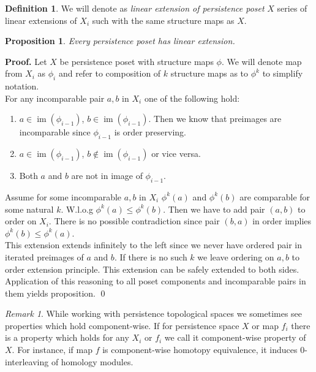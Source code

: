 \documentclass[a4paper, 12pt]{article}
\newtheorem{proposition}{Proposition}
\theoremstyle{definition}
\newtheorem{definition}{Definition}
\theoremstyle{remark}
\newtheorem{remark}{Remark}
\newenvironment{pf}{\noindent\textbf{Proof.}}{\qed}
\newcommand{\define}[1]{{\textit{#1}}}
\renewcommand{\leq}{\leqslant}
\begin{document}
\begin{definition}
  We will denote as \define{linear extension of persistence poset} $X$ series of linear extensions of $X_i$ such with the same structure maps as $X$.
\end{definition}

\begin{proposition}
  Every persistence poset has linear extension.
\end{proposition}

\begin{pf}
  Let $X$ be persistence poset with structure maps $\phi$. We will denote map from $X_i$ as $\phi_i$ and refer to composition of $k$ structure maps as to $\phi^k$ to simplify notation.\\

  For any incomparable pair $a,b$ in $X_i$ one of the following hold:
  \begin{enumerate}
    \item $a \in \operatorname{im}(\phi_{i-1})$, $b \in \operatorname{im}(\phi_{i-1})$. Then we know that preimages are incomparable since $\phi_{i-1}$ is order preserving.
    \item $a \in \operatorname{im}(\phi_{i-1})$, $b \not\in \operatorname{im}(\phi_{i-1})$ or vice versa.
    \item Both $a$ and $b$ are not in image of $\phi_{i-1}$.
  \end{enumerate}

  Assume for some incomparable $a,b$ in $X_i$ $\phi^k(a)$ and $\phi^k(b)$ are comparable for some natural $k$. W.l.o.g $\phi^k(a) \leq \phi^k(b)$. Then we have to add pair $(a,b)$ to order on $X_i$. There is no possible contradiction since pair $(b,a)$ in order implies $\phi^k(b) \leq \phi^k(a)$.\\
  This extension extends infinitely to the left since we never have ordered pair in iterated preimages of $a$ and $b$. If there is no such $k$ we leave ordering on $a,b$ to order extension principle. This extension can be safely extended to both sides.\\

  Application of this reasoning to all poset components and incomparable pairs in them yields proposition.
\end{pf}\\

\begin{remark}
  While working with persistence topological spaces we sometimes see properties which hold component-wise. If for persistence space $X$ or map $f_i$ there is a property which holds for any $X_i$ or $f_i$ we call it component-wise property of $X$. For instance, if map $f$ is component-wise homotopy equivalence, it induces $0$-interleaving of homology modules.
\end{remark}
\end{document}
